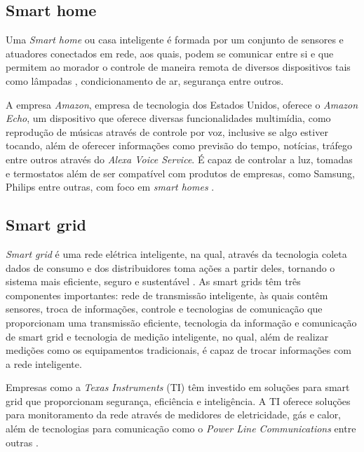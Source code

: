 \documentclass[
	article,			%
	11pt,				%
	oneside,			%
	a4paper,			%
	section=TITLE,		%
	subsection=TITLE,	%
	english,			%
	brazil,				%
	sumario=tradicional
	]{abntex2}
\begin{document}
\subsection{Smart home}

Uma \textit{Smart home} ou casa inteligente é formada por um conjunto de sensores e atuadores 
conectados em rede, aos quais, podem se comunicar entre si e que permitem ao morador o controle de 
maneira remota de diversos dispositivos tais como lâmpadas \cite{mandula2015}, 
condicionamento de ar, segurança entre outros.

A empresa \textit{Amazon}, empresa de tecnologia dos Estados Unidos, oferece o \textit{Amazon 
Echo}, um dispositivo que oferece diversas funcionalidades multimídia, como reprodução de músicas 
através 
de controle por voz, inclusive se algo estiver tocando, além de oferecer informações como previsão 
do tempo, notícias, tráfego entre outros através do \textit{Alexa Voice Service}. É capaz de 
controlar a luz, tomadas e termostatos além de ser compatível com produtos de empresas, como 
Samsung, Philips entre outras, com foco em \textit{smart homes} \cite{amazon2017}.

\subsection{Smart grid}

\textit{Smart grid} é uma rede elétrica inteligente, na qual, através da tecnologia coleta dados de 
consumo e dos distribuidores toma ações a partir deles, tornando o sistema mais eficiente, seguro 
e sustentável \cite{CECILIA2016}. As smart grids têm três componentes importantes: rede de 
transmissão inteligente, às quais contêm sensores, troca de informações, controle e tecnologias de 
comunicação que proporcionam uma transmissão eficiente, tecnologia da informação e comunicação de 
smart grid  e tecnologia de medição inteligente, no qual, além de realizar medições como os 
equipamentos tradicionais, é capaz de trocar informações com a rede inteligente. 

Empresas como a \textit{Texas Instruments} (TI) têm investido em soluções para smart grid que 
proporcionam segurança, eficiência e inteligência. A TI oferece soluções para monitoramento da rede 
através de medidores de eletricidade, gás e calor, além de tecnologias para comunicação como o 
\textit{Power Line Communications} entre outras \cite{texasinstruments2017}.

\end{document}
